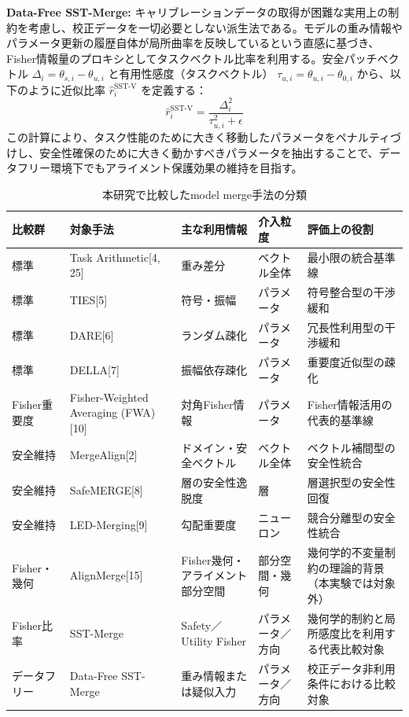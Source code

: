 \documentclass{article}
\begin{document}
\textbf{Data-Free SST-Merge:}
キャリブレーションデータの取得が困難な実用上の制約を考慮し、校正データを一切必要としない派生法である。モデルの重み情報やパラメータ更新の履歴自体が局所曲率を反映しているという直感に基づき、Fisher情報量のプロキシとしてタスクベクトル比率を利用する。安全パッチベクトル $\Delta_i = \theta_{s,i} - \theta_{u,i}$ と有用性感度（タスクベクトル） $\tau_{u,i} = \theta_{u,i} - \theta_{0,i}$ から、以下のように近似比率 $\hat{r}_i^{\text{SST-V}}$ を定義する：
\[ \hat{r}_i^{\text{SST-V}} = \frac{\Delta_i^2}{\tau_{u,i}^2 + \epsilon} \]
この計算により、タスク性能のために大きく移動したパラメータをペナルティづけし、安全性確保のために大きく動かすべきパラメータを抽出することで、データフリー環境下でもアライメント保護効果の維持を目指す。

\begin{table}[t]
\centering
\caption{本研究で比較したmodel merge手法の分類}
\label{tab:baseline_methods}
\small
\begin{tabular}{p{1.8cm}p{2.6cm}p{2.8cm}p{2.3cm}p{4.3cm}}
\toprule
比較群 & 対象手法 & 主な利用情報 & 介入粒度 & 評価上の役割 \\
\midrule
標準 & Task Arithmetic[4, 25] & 重み差分 & ベクトル全体 & 最小限の統合基準線 \\
標準 & TIES[5] & 符号・振幅 & パラメータ & 符号整合型の干渉緩和 \\
標準 & DARE[6] & ランダム疎化 & パラメータ & 冗長性利用型の干渉緩和 \\
標準 & DELLA[7] & 振幅依存疎化 & パラメータ & 重要度近似型の疎化 \\
Fisher重要度 & Fisher-Weighted Averaging (FWA)[10] & 対角Fisher情報 & パラメータ & Fisher情報活用の代表的基準線 \\
安全維持 & MergeAlign[2] & ドメイン・安全ベクトル & ベクトル全体 & ベクトル補間型の安全性統合 \\
安全維持 & SafeMERGE[8] & 層の安全性逸脱度 & 層 & 層選択型の安全性回復 \\
安全維持 & LED-Merging[9] & 勾配重要度 & ニューロン & 競合分離型の安全性統合 \\
Fisher・幾何 & AlignMerge[15] & Fisher幾何・アライメント部分空間 & 部分空間・幾何 & 幾何学的不変量制約の理論的背景（本実験では対象外） \\
Fisher比率 & SST-Merge & Safety／Utility Fisher & パラメータ／方向 & 幾何学的制約と局所感度比を利用する代表比較対象 \\
データフリー & Data-Free SST-Merge & 重み情報または疑似入力 & パラメータ／方向 & 校正データ非利用条件における比較対象 \\
\bottomrule
\end{tabular}
\end{table}
\end{document}
